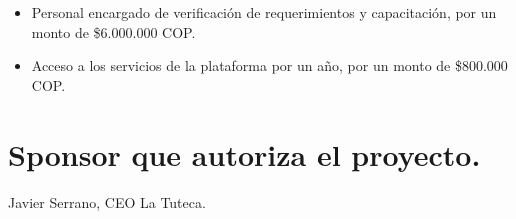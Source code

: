\begin{itemize}
	\item Personal encargado de verificaci\'on de requerimientos y capacitaci\'on, por un monto
	de \$6.000.000 COP.
	
	\item Acceso a los servicios de la plataforma por un a\~no, por un monto de \$800.000 COP.
\end{itemize}
\chapter{Sponsor que autoriza el proyecto.}
%
Javier Serrano, CEO La Tuteca.